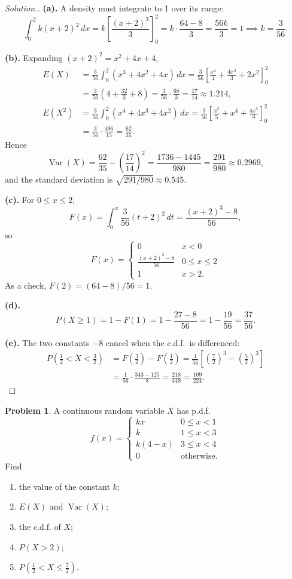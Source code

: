 \documentclass[12pt,a4paper]{report}
\theoremstyle{definition}
\theoremstyle{plain}
\theoremstyle{definition}
\newtheorem{problemx}{Problem}[section]
\newenvironment{problem}{\begin{problemx}}{\end{problemx}}
\newenvironment{solution}
  {\renewcommand{\qedsymbol}{}\begin{proof}[\textit{Solution}.]}
  {\end{proof}}
\begin{document}
\begin{solution}
\textbf{(a).} A density must integrate to 1 over its range:
\[\int_0^2 k(x+2)^2\,dx = k\left[\frac{(x+2)^3}{3}\right]_0^2
 = k\cdot\frac{64-8}{3} = \frac{56k}{3} = 1 \implies k = \frac{3}{56}.\]

\textbf{(b).} Expanding $(x+2)^2 = x^2+4x+4$,
\begin{align*}
E(X) &= \frac{3}{56}\int_0^2 (x^3+4x^2+4x)\,dx
 = \frac{3}{56}\left[\frac{x^4}{4}+\frac{4x^3}{3}+2x^2\right]_0^2\\
 &= \frac{3}{56}\left(4+\frac{32}{3}+8\right) = \frac{3}{56}\cdot\frac{68}{3}
  = \frac{17}{14} \approx 1.214,\\
E(X^2) &= \frac{3}{56}\int_0^2 (x^4+4x^3+4x^2)\,dx
 = \frac{3}{56}\left[\frac{x^5}{5}+x^4+\frac{4x^3}{3}\right]_0^2\\
 &= \frac{3}{56}\cdot\frac{496}{15} = \frac{62}{35}.
\end{align*}
Hence
\[\operatorname{Var}(X) = \frac{62}{35}-\left(\frac{17}{14}\right)^{2}
 = \frac{1736-1445}{980} = \frac{291}{980} \approx 0.2969,\]
and the standard deviation is $\sqrt{291/980} \approx 0.545$.

\textbf{(c).} For $0\leq x\leq 2$,
\[F(x) = \int_0^x \frac{3}{56}(t+2)^2\,dt = \frac{(x+2)^3-8}{56},\]
so
\[F(x) = \begin{cases} 0 & x<0\\[2pt]
\frac{(x+2)^3-8}{56} & 0\leq x\leq 2\\[6pt]
1 & x>2.\end{cases}\]
As a check, $F(2) = (64-8)/56 = 1$.

\textbf{(d).} \[P(X\geq 1) = 1-F(1) = 1-\frac{27-8}{56} = 1-\frac{19}{56} = \frac{37}{56}.\]

\textbf{(e).} The two constants $-8$ cancel when the c.d.f.\ is differenced:
\begin{align*}
P\left(\tfrac12<X<\tfrac32\right)
 &= F\left(\tfrac32\right)-F\left(\tfrac12\right)
  = \frac{1}{56}\left[\left(\tfrac{7}{2}\right)^{3}-\left(\tfrac{5}{2}\right)^{3}\right]\\
 &= \frac{1}{56}\cdot\frac{343-125}{8} = \frac{218}{448} = \frac{109}{224}.
\end{align*}
\end{solution}

\begin{problem}
A continuous random variable $X$ has p.d.f.
\[f(x) = \begin{cases}
kx & 0\leq x<1\\
k & 1\leq x<3\\
k(4-x) & 3\leq x<4\\
0 & \text{otherwise.}
\end{cases}\]
Find
\begin{enumerate}
\item[(a).] the value of the constant $k$;
\item[(b).] $E(X)$ and $\operatorname{Var}(X)$;
\item[(c).] the c.d.f. of $X$;
\item[(d).] $P(X>2)$;
\item[(e).] $P\left(\frac{1}{2}<X\leq\frac{7}{2}\right)$.
\end{enumerate}
\end{problem}
\end{document}
